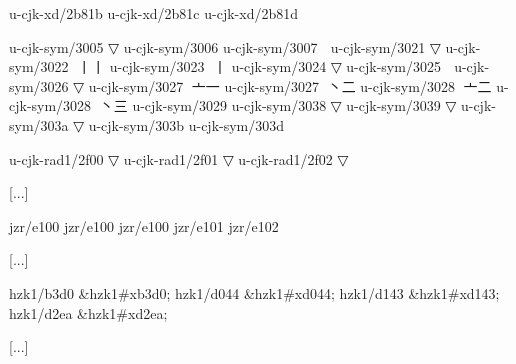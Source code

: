 \begin{multicols}{2}
[...] 
 
u-cjk-xd/2b81b	{	} 
u-cjk-xd/2b81c	{	} 
u-cjk-xd/2b81d	{	} 
 
u-cjk-sym/3005	{	}▽ 
u-cjk-sym/3006	{	} 
u-cjk-sym/3007	{\cjk{}}	{\cnxJzr{}\cjkgGlue} 
u-cjk-sym/3021	{	}▽ 
u-cjk-sym/3022	{\cjk{}}	{\cnxJzr{}\cjkgGlue}{\cjk{}丨丨} 
u-cjk-sym/3023	{\cjk{}}	{\cnxJzr{}\cjkgGlue}{丨} 
u-cjk-sym/3024	{	}▽ 
u-cjk-sym/3025	{\cjk{}}	{\cnxJzr{}\cjkgGlue} 
u-cjk-sym/3026	{	}▽ 
u-cjk-sym/3027	{\cjk{}}	{\cnxJzr{}\cjkgGlue}{\cjk{}亠一} 
u-cjk-sym/3027	{\cjk{}}	{\cnxJzr{}\cjkgGlue}{\cjk{}丶二} 
u-cjk-sym/3028	{\cjk{}}	{\cnxJzr{}\cjkgGlue}{\cjk{}亠二} 
u-cjk-sym/3028	{\cjk{}}	{\cnxJzr{}\cjkgGlue}{\cjk{}丶三} 
u-cjk-sym/3029	{	} 
u-cjk-sym/3038	{	}▽ 
u-cjk-sym/3039	{	}▽ 
u-cjk-sym/303a	{	}▽ 
u-cjk-sym/303b	{	} 
u-cjk-sym/303d	{\cjk{}}	{\cnxJzr{}\cjkgGlue} 
 
u-cjk-rad1/2f00	{	}▽ 
u-cjk-rad1/2f01	{	}▽ 
u-cjk-rad1/2f02	{	}▽ 
 
[...] 
 
jzr/e100	{	} 
jzr/e100	{	} 
jzr/e100	{	} 
jzr/e101	{	} 
jzr/e102	{	} 
 
[...] 
 
hzk1/b3d0	\&hzk1\#xb3d0;	 
hzk1/d044	\&hzk1\#xd044;	 
hzk1/d143	\&hzk1\#xd143;	 
hzk1/d2ea	\&hzk1\#xd2ea;	 
 
[...] 
\endgroup{}\endgroup{}\end{multicols}
